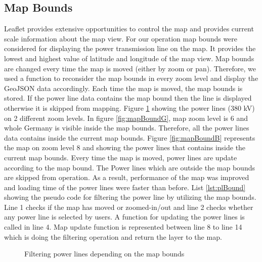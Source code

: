 \subsection{Map Bounds}

Leaflet provides extensive opportunities to control the map and provides current scale information about the map view. For our operation map bounds were considered for displaying the power transmission line on the map. It provides the lowest and highest value of latitude and longitude of the map view. Map bounds are changed every time the map is moved (either by zoom or pan).  Therefore, we used a function to reconsider the map bounds in every zoom level and display the GeoJSON data accordingly. Each time the map is moved, the map bounds is stored. If the power line data contains the map bound then the line is displayed otherwise it is skipped from mapping. Figure \ref{fig:mpbound} showing the power lines (380 kV) on 2 different zoom levels. In figure \ref{fig:mapBoundG}, map zoom level is 6 and whole Germany is visible inside the map bounds. Therefore, all the power lines data contains inside the current map bounds. Figure \ref{fig:mapBoundB} represents the map on zoom level 8 and showing the power lines that contains inside the current map bounds. Every time the map is moved, power lines are update according to the map bound. The Power lines which are outside the map bounds are skipped from operation. As a result, performance of the map was improved and loading time of the power lines were faster than before. List \ref{lst:plBound} showing the pseudo code for filtering the power line by utilizing the map bounds. Line 1 checks if the map has moved or zoomed-in/out and line 2 checks whether any power line is selected by users. A function for updating the power lines is called in line 4. Map update function is represented between line 8 to line 14 which is doing the filtering operation and return the layer to the map. 

\begin{figure}
  \begin{center}
\hfill
{}
\hfill
\caption{Filtering power lines depending on the map bounds}
\label{fig:mpbound}
\end{center}
\end{figure}

